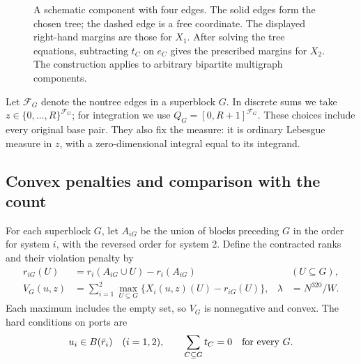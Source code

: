 \begin{figure}[tb]
\centering
{}
\caption{A schematic component with four edges. The solid edges form
the chosen tree; the dashed edge is a free coordinate. The displayed
right-hand margins are those for $X_1$. After solving the tree equations,
subtracting $t_C$ on $e_C$ gives the prescribed margins for $X_2$.
The construction applies to arbitrary bipartite multigraph components.}
\label{fig:tree-ports}
\end{figure}

Let $\mathcal F_G$ denote the nontree edges in a superblock $G$. In discrete sums
we take $z\in\{0,\ldots,R\}^{\mathcal F_G}$; for integration we use
$Q_G=[0,R+1]^{\mathcal F_G}$. These choices include every original base pair.
They also fix the measure: it is ordinary Lebesgue measure in $z$,
with a zero-dimensional integral equal to its integrand.

\subsection{Convex penalties and comparison with the count}

For each superblock $G$, let $A_{iG}$ be the union of blocks preceding
$G$ in the order for system $i$, with the reversed order for system 2.
Define the contracted ranks and their violation penalty by
\begin{align}
 r_{iG}(U)&=r_i(A_{iG}\cup U)-r_i(A_{iG})
       &&(U\subseteq G),\\
 V_G(u,z)&=\sum_{i=1}^2\max_{U\subseteq G}
                 \{X_i(u,z)(U)-r_{iG}(U)\},
 &\lambda&=N^{320}/W.\label{eq:block-penalty}
\end{align}
Each maximum includes the empty set, so $V_G$ is nonnegative and convex.
The hard conditions on ports are
\begin{equation}\label{eq:hard-port-conditions}
 u_i\in B(\bar r_i)\quad(i=1,2),\qquad
 \sum_{C\subseteq G}t_C=0\quad\hbox{for every }G.
\end{equation}

